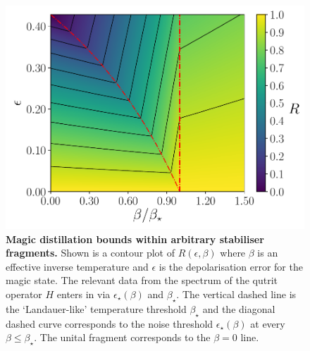 \documentclass[pra,
aps,
twocolumn,
superscriptaddress,
groupedaddress,
nofootinbib,
reprint
]{revtex4-1}
\begin{document}
\begin{figure}[t!]
    \centering
    \includegraphics[scale=0.4]{figs/rate_scatter.pdf}
    \caption{\textbf{Magic distillation bounds within arbitrary stabiliser fragments.}
  Shown is a contour plot of  $R(\epsilon, \beta)$ where $\beta$ is an effective inverse temperature and $\epsilon$ is the depolarisation error for the magic state. The relevant data from the spectrum of the qutrit operator $H$ enters in via $\epsilon_\star(\beta)$ and $\beta_\star$.  The vertical dashed line is the `Landauer-like' temperature threshold $\beta_\star$ and the diagonal dashed curve corresponds to the noise threshold $\epsilon_\star (\beta)$ at every $\beta \leq \beta_\star$. The unital fragment corresponds to the $\beta =0 $ line.
    }
    \label{fig:rate_contour}
\end{figure}
\end{document}
